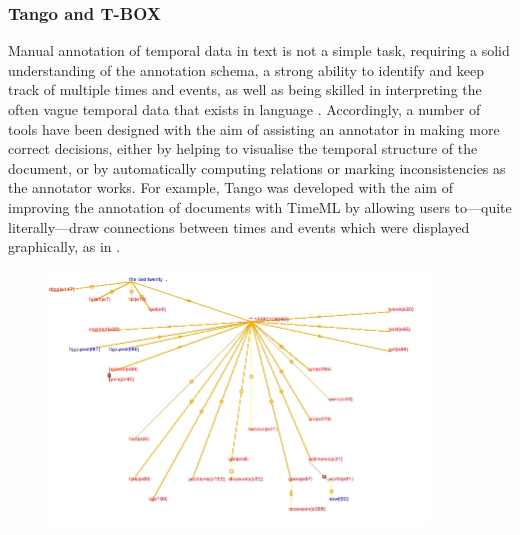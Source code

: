\documentclass[a4paper,12pt,leqno]{article}
\begin{document}
\subsubsection{Tango and T-BOX}\label{ssub:tango-tbox}
Manual annotation of temporal data in text is not a simple task, requiring a solid understanding of the annotation schema, a strong ability to identify and keep track of multiple times and events, as well as being skilled in interpreting the often vague temporal data that exists in language \citep[pp. 213--214]{Verhagen2005}. Accordingly, a number of tools have been designed with the aim of assisting an annotator in making more correct decisions, either by helping to visualise the temporal structure of the document, or by automatically computing relations or marking inconsistencies as the annotator works. For example, Tango \citep{pustejovsky2003tango} was developed with the aim of improving the annotation of documents with TimeML by allowing users to---quite literally---draw connections between times and events which were displayed graphically, as in .
\begin{center}
	\begin{figure}[h]
		\centering
		\includegraphics[width=0.9\textwidth]{images/tango}
	\end{figure}
	\label{fig:tango}
\end{center}
\end{document}
